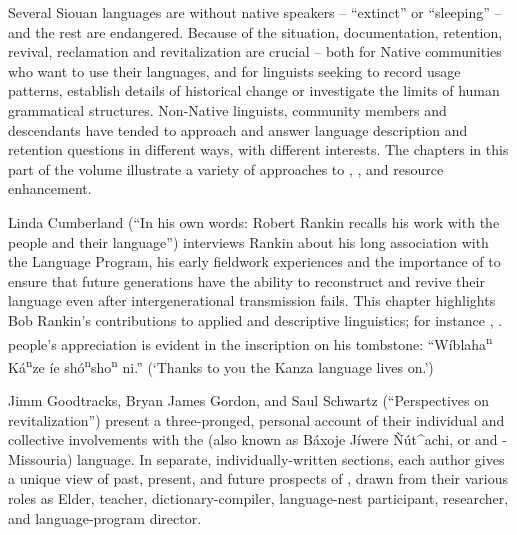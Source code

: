 \begin{refsection}

Several Siouan languages are without native speakers -- ``extinct'' or ``sleeping'' -- and the rest are endangered. Because of the situation, documentation, retention, revival, reclamation and revitalization are crucial -- both for Native communities who want to use their languages, and for linguists seeking to record usage patterns, establish details of historical change or investigate the limits of human grammatical structures. Non-Native linguists, community members and descendants have tended to approach and answer language description and retention questions in different ways, with different interests. The chapters in this part of the volume illustrate a variety of approaches to , , and resource enhancement.

Linda Cumberland (``In his own words: Robert Rankin recalls his work with the  people and their language'') interviews Rankin about his long association with the  Language Program, his early fieldwork experiences and the importance of  to ensure that future generations have the ability to reconstruct and revive their language even after intergenerational transmission fails. This chapter highlights Bob Rankin's contributions to applied and descriptive linguistics; for instance \citet{CumberlandRankin2012}, \citet{Rankin1989}.  people's appreciation is evident in the inscription on his tombstone: ``W\'iblaha\textsuperscript{n} K\'a\textsuperscript{n}ze \'ie sh\'o\textsuperscript{n}sho\textsuperscript{n} ni.'' (`Thanks to you the Kanza language lives on.')

Jimm Goodtracks, Bryan James Gordon, and Saul Schwartz (``Perspectives on  revitalization'') present a three-pronged, personal account of their individual and collective involvements with the  (also known as Báxoje Jíwere \~{N}út\^{}achi, or  and -Missouria) language. In separate, individually-written sections, each author gives a unique view of past, present, and future prospects of , drawn from their various roles as Elder, teacher, dictionary-compiler, language-nest participant, researcher, and language-program director. 


\end{refsection}
